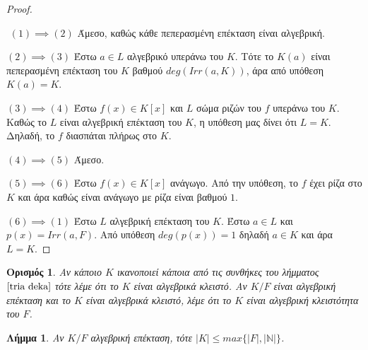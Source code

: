\documentclass[oneside,a4paper]{article}
\newtheorem{lemma}{Λήμμα}
\newtheorem*{defn}{Ορισμός}
\begin{document}
\begin{proof} $ $

	$ $\newline
	$(1) \implies (2)$ Άμεσο, καθώς κάθε πεπερασμένη επέκταση είναι αλγεβρική.

	\noindent $(2) \implies (3)$ Έστω $a \in L$ αλγεβρικό υπεράνω του $K$. Τότε το $K(a)$ είναι πεπερασμένη επέκταση του $K$ βαθμού $deg(Irr(a,K))$, άρα από υπόθεση $K(a) = K$.
	
	\noindent $(3) \implies (4)$ Έστω $f(x) \in K[x]$ και $L$ σώμα ριζών του $f$ υπεράνω του $K$. Καθώς το $L$ είναι αλγεβρική επέκταση του $K$, η υπόθεση μας δίνει ότι $L=K$. Δηλαδή, το $f$ διασπάται πλήρως στο $K$.
	
	\noindent $(4) \implies (5)$ Άμεσο.
	
	\noindent $(5) \implies (6)$ Έστω $f(x) \in K[x]$ ανάγωγο. Από την υπόθεση, το $f$ έχει ρίζα στο $K$ και άρα καθώς είναι ανάγωγο με ρίζα είναι βαθμού $1$.
	
	\noindent $(6) \implies (1)$ Έστω $L$ αλγεβρική επέκταση του $K$. Έστω $a \in L$ και $p(x) = Irr(a,F)$. Από υπόθεση $deg(p(x)) = 1$ δηλαδή $a \in K$ και άρα $L=K$.

\end{proof}
\vspace{0.1cm}
\begin{defn} Αν κάποιο $K$ ικανοποιεί κάποια από τις συνθήκες του λήμματος $\ref{tria deka}$ τότε λέμε ότι το $K$ είναι αλγεβρικά κλειστό. Αν $K/F$ είναι αλγεβρική επέκταση και το $K$ είναι αλγεβρικά κλειστό, λέμε ότι το $K$ είναι αλγεβρική κλειστότητα του $F$.
\end{defn}
\vspace{0.1cm}
\begin{lemma}
	Αν $K/F$ αλγεβρική επέκταση, τότε $|K| \leq max\{|F| , |\mathbb N|\}$.
\end{lemma}
\end{document}
